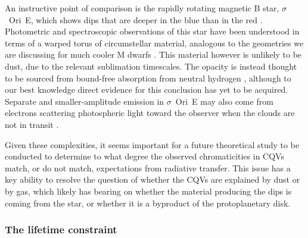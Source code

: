 \documentclass[11pt,twocolumn,tighten]{aastex63}
\begin{document}
An instructive point of comparison is the rapidly rotating magnetic B
star, $\sigma$~Ori~E, which shows dips that are deeper in the blue
than in the red \citep{1977ApJ...216L..31H}.  Photometric and
spectroscopic observations of this star have been understood in terms
of a warped torus of circumstellar material, analogous to the
geometries we are discussing for much cooler M dwarfs
\citep{1978ApJ...224L...5L,1985Ap&SS.116..285N,2005ApJ...630L..81T}.  This material
however is unlikely to be dust, due to the relevant sublimation
timescales.  The opacity is instead thought to be sourced from
bound-free absorption from neutral hydrogen
\citep{1985Ap&SS.116..285N}, although to our best knowledge direct
evidence for this conclusion has yet to be acquired.  Separate and
smaller-amplitude emission in $\sigma$~Ori~E may also come from
electrons scattering photospheric light toward the observer when the
clouds are not in transit \citep{2022MNRAS.511.4815B}.

Given these complexities, it seems important for a future theoretical
study to be conducted to determine to what degree the observed
chromaticities in CQVs match, or do not match, expectations from
radiative transfer.  This issue has a key ability to resolve the
question of whether the CQVs are explained by dust or by gas, which
likely has bearing on whether the material producing the dips is
coming from the star, or whether it is a byproduct of the
protoplanetary disk.



\subsubsection{The lifetime constraint}
\end{document}
